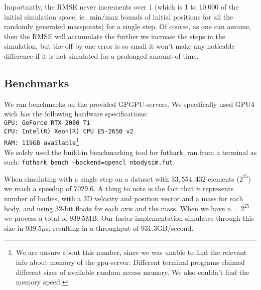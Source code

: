 Importantly, the RMSE never increments over 1 (which is 1 to 10.000 of the
initial simulation space, ie.\ min/max bounds of initial positions for all the
randomly generated masspoints) for a single step. Of course, as one can assume,
then the RMSE will accumulate the further we increase the steps in the
simulation, but the off-by-one error is so small it won't make any noticable
difference if it is not simulated for a prolonged amount of time.


\subsection{Benchmarks}
We ran benchmarks on the provided GPGPU-servers. We specifically
used GPU4 wich has the following hardware specifications:\\
\texttt{GPU: GeForce RTX 2080 Ti}\\
\texttt{CPU: Intel(R) Xeon(R) CPU E5-2650 v2}\\
\texttt{RAM: 119GB available}\footnote{We are unsure about this number, since we was
unable to find the relevant info about memory of the gpu-server. Different terminal
programs claimed different sizes of available random access memory. We also couldn't
find the memory speed.}\\

We solely used the build-in benchmarking tool for futhark, ran from a terminal
as such: \texttt{futhark bench --backend=opencl nbodysim.fut}.

When simulating with a single step on a dataset with $33,554,432$ elements
($2^{25}$) we reach a speedup of $7029.6$. A thing to note is the fact that
$n$ represents number of bodies, with a 3D velocity and position vector and a
mass for each body, and using 32-bit floats for each axis and the mass. When we
have $n = 2^{25}$ we process a total of $939.5$MB. Our faster implementation
simulates through this size in $939.5\mu$s, resulting in a throughput of
$931.3$GB/second.

